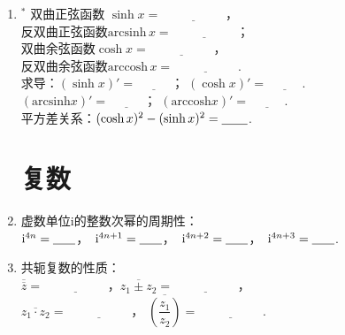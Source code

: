 \documentclass{article}
\newif\ifte
\newcommand{\e}{\mathrm{e}}
\renewcommand{\i}{\mathrm{i}}
\begin{document}
\begin{multicols}{2}
\begin{enumerate}[leftmargin=20pt]
\item $^*$ 双曲正弦函数 $ \sinh x=\underline{\ \ifte 
    \dfrac{\e^x-\e^{-x}}{2}\else \hspace{2cm} \fi\ } $，\\
反双曲正弦函数$ \mathrm{arcsinh}\, x=\underline{\ \ifte \ln(x+\sqrt{x^2+1})
    \else \hspace{2cm} \fi\ } $； \\
双曲余弦函数$\cosh x=\underline{\ \ifte \dfrac{\e^x+\e^{-x}}{2}
    \else \hspace{2cm} \fi\ } $，\\
反双曲余弦函数$ \mathrm{arccosh}\, x=\underline{\ \ifte \ln(x+\sqrt{x^2-1})
    \else \hspace{2cm} \fi\ } $.\\
求导：$ (\sinh x)'=\underline{\ \ifte \cosh x\else \hspace{1cm} \fi\ } $；
$ (\cosh x)'=\underline{\ \ifte \sinh x\else \hspace{1cm} \fi\ } $. \\
$ (\mathrm{arcsinh} x)'=\underline{\ \ifte \dfrac{1}{\sqrt{x^2+1}}
    \else \hspace{1cm} \fi\ } $；
$ (\mathrm{arccosh} x)'=\underline{\ \ifte \dfrac{1}{\sqrt{x^2-1}}
    \else \hspace{1cm} \fi\ } $. \\
平方差关系：$ (\cosh x)^2-(\sinh x)^2=\underline{\ \ifte 1
    \else \hspace{0.5cm} \fi\ } $.

\section{复数}
\item 虚数单位$ \i $的整数次幂的周期性：\\
$ \i^{4n}=\underline{\ \ifte 1\else \hspace{0.4cm} \fi\ } $，\  
$ \i^{4n+1}=\underline{\ \ifte \i\else \hspace{0.4cm} \fi\ } $，\  
$ \i^{4n+2}=\underline{\ \ifte -1\else \hspace{0.4cm} \fi\ } $，\ 
$ \i^{4n+3}=\underline{\ \ifte -\i\else \hspace{0.4cm} \fi\ } $. 

\item 共轭复数的性质：\\ $ \overline{\overline{z}}=\underline{\ 
\ifte z\else \hspace{2cm} \fi\ }$，$ \overline{z_1\pm z_2}=
\underline{\ \ifte \overline{z_1}\pm \overline{z_2}
    \else \hspace{2cm} \fi\ } $，\\
$ \overline{z_1\cdot z_2}=\underline{\ \ifte 
 \overline{z_1}\cdot \overline{z_2} \else \hspace{2cm} \fi\ } $，
$ \overline{\left(\dfrac{z_1}{z_2}\right)}=\underline{\ \ifte 
\dfrac{\overline{z_1}}{\overline{z_2}} \else \hspace{2cm} \fi\ } $.  


\end{enumerate}
\end{multicols}
\end{document}
